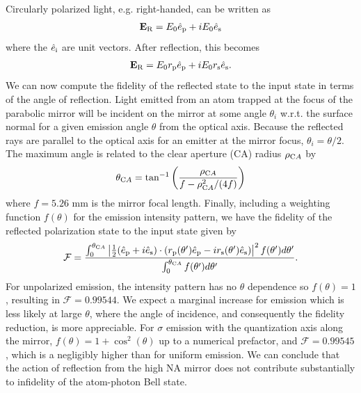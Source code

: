 Circularly polarized light, e.g. right-handed, can be written as
\begin{equation}
    \textbf{E}_{\textrm R} = E_0 \hat{e}_{\textrm p} + i E_0 \hat{e}_{\textrm s}
\end{equation}
where the $\hat{e}_{\textrm i}$ are unit vectors. After reflection, this becomes
\begin{equation}
    \textbf{E}_{\textrm R} = E_0 r_{\textrm p} \hat{e}_{\textrm p} + i E_0 r_{\textrm s} \hat{e}_{\textrm s}.
\end{equation}
We can now compute the fidelity of the reflected state to the input state in terms of the angle of reflection. Light emitted from an atom trapped at the focus of the parabolic mirror will be incident on the mirror at some angle $\theta_i$ w.r.t. the surface normal for a given emission angle $\theta$ from the optical axis. Because the reflected rays are parallel to the optical axis for an emitter at the mirror focus, $\theta_i=\theta/2$. The maximum angle is related to the clear aperture (CA) radius $\rho_{\textrm CA}$ by 
\begin{equation}
    \theta_{\textrm CA} = \tan^{-1}
    \left(\frac{\rho_{\textrm CA}}{f-\rho_{\textrm CA}^2/(4f)}\right)
\end{equation}
where $f=5.26$ mm is the mirror focal length. Finally, including a weighting function $f(\theta)$ for the emission intensity pattern, we have the fidelity of the reflected polarization state to the input state given by
\begin{equation}
    \mathcal{F} = \frac{\int_0^{ \theta_{\textrm CA}} \left|\frac{1}{2}(\hat{e}_{\textrm p} + i \hat{e}_{\textrm s})\cdot(r_{\textrm p}(\theta') \hat{e}_{\textrm p} - i r_{\textrm s}(\theta') \hat{e}_{\textrm s})\right|^2 f(\theta') d \theta'}{\int_0^{ \theta_{\textrm CA}} f(\theta')  d\theta'}.
\end{equation}
For unpolarized emission, the intensity pattern has no $\theta$ dependence so $f(\theta)=1$, resulting in $\mathcal{F}=0.99544$. We expect a marginal increase for emission which is less likely at large $\theta$, where the angle of incidence, and consequently the fidelity reduction, is more appreciable. For $\sigma$ emission with the quantization axis along the mirror, $f(\theta)=1+\cos^2(\theta)$ up to a numerical prefactor, and $\mathcal{F}=0.99545$, which is a negligibly higher than for uniform emission. We can conclude that the action of reflection from the high NA mirror does not contribute substantially to infidelity of the atom-photon Bell state.



